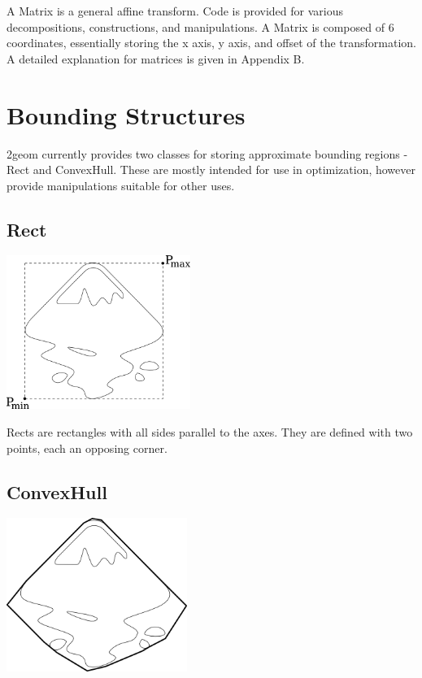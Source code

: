\documentclass[openany]{book}
\newcommand{\code}[1]{\textsf{#1}}
\begin{document}
A \code{Matrix} is a general affine transform.  Code is provided for
various decompositions, constructions, and manipulations.  A
\code{Matrix} is composed of 6 coordinates, essentially storing the
x axis, y axis, and offset of the transformation.  A detailed
explanation for matrices is given in Appendix B.

\section{Bounding Structures}

2geom currently provides two classes for storing approximate bounding
regions - \code{Rect} and \code{ConvexHull}.  These are mostly intended
for use in optimization, however provide manipulations suitable for
other uses.

\subsection{Rect}

\includegraphics[height=50mm]{media/rect.png}

\code{Rect}s are rectangles with all sides parallel to the axes. They
are defined with two points, each an opposing corner.

\subsection{ConvexHull}

\includegraphics[height=50mm]{media/convex.png}
\end{document}
